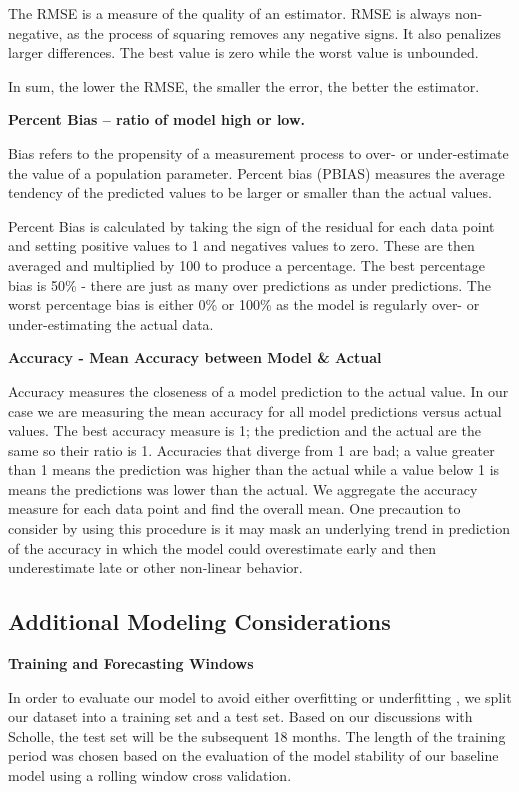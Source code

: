 \documentclass[12pt,oneside]{chicagocapstone}
\begin{document}
The RMSE is a measure of the quality of an estimator. RMSE is always
non-negative, as the process of squaring removes any negative signs. It
also penalizes larger differences. The best value is zero while the
worst value is unbounded.

In sum, the lower the RMSE, the smaller the error, the better the
estimator.

\textbf{Percent Bias -- ratio of model high or low.}

Bias refers to the propensity of a measurement process to over- or
under-estimate the value of a population parameter. Percent bias (PBIAS)
measures the average tendency of the predicted values to be larger or
smaller than the actual values.

Percent Bias is calculated by taking the sign of the residual for each
data point and setting positive values to 1 and negatives values to
zero. These are then averaged and multiplied by 100 to produce a
percentage. The best percentage bias is 50\% - there are just as many
over predictions as under predictions. The worst percentage bias is
either 0\% or 100\% as the model is regularly over- or under-estimating
the actual data.

\textbf{Accuracy - Mean Accuracy between Model \& Actual}

Accuracy measures the closeness of a model prediction to the actual
value. In our case we are measuring the mean accuracy for all model
predictions versus actual values. The best accuracy measure is 1; the
prediction and the actual are the same so their ratio is 1. Accuracies
that diverge from 1 are bad; a value greater than 1 means the prediction
was higher than the actual while a value below 1 is means the
predictions was lower than the actual. We aggregate the accuracy measure
for each data point and find the overall mean. One precaution to
consider by using this procedure is it may mask an underlying trend in
prediction of the accuracy in which the model could overestimate early
and then underestimate late or other non-linear behavior.

\subsection*{Additional Modeling
Considerations}\label{methodology-AdditionalConsiderations}

\textbf{Training and Forecasting Windows}

In order to evaluate our model to avoid either overfitting or
underfitting , we split our dataset into a training set and a test set.
Based on our discussions with Scholle, the test set will be the
subsequent 18 months. The length of the training period was chosen based
on the evaluation of the model stability of our baseline model using a
rolling window cross validation.
\end{document}
